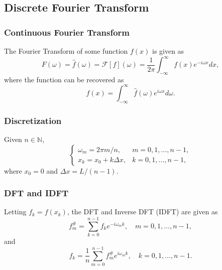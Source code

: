 \documentclass{beamer}
\begin{document}
\subsection{Discrete Fourier Transform}
\begin{frame}
	\frametitle{Continuous Fourier Transform}
	The Fourier Transform of some function $f(x)$ is given as
	\begin{equation*}
		F(\omega) = \hat{f}(\omega) = \mathcal{F}\left[f\right](\omega) = \frac{1}{2\pi}\int_{-\infty}^{\infty}{f(x)e^{-i\omega x}dx},
	\end{equation*}
	where the function can be recovered as
	\begin{equation*}
		f(x) = \int_{-\infty}^{\infty}{\hat{f}(\omega)e^{i\omega x}d\omega}.
	\end{equation*}
\end{frame}
\begin{frame}
	\frametitle{Discretization}
	Given $n \in \mathbb{N}$,
	\begin{equation*}
		\begin{cases}
			\omega_m = 2\pi m/n, & m = 0,1,\dots,n-1, \\
			x_k = x_0 + k\Delta x, & k = 0,1,\dots,n-1,
		\end{cases}
	\end{equation*}
	where $x_0 = 0$ and $\Delta x = L/(n-1)$.
\end{frame}
\begin{frame}
	\frametitle{DFT and IDFT}
	Letting $f_k = f(x_k)$, the DFT and Inverse DFT (IDFT) are given as
	\begin{equation*}
		f_{m}^{\#} = \sum_{k=0}^{n-1}{f_ke^{-i\omega_mk}}, \quad m = 0,1,\dots,n-1,
	\end{equation*}
	and
	\begin{equation*}
		f_{k} = \frac{1}{n}\sum_{m=0}^{n-1}{f_{m}^{\#}e^{i\omega_mk}}, \quad k = 0,1,\dots,n-1.
	\end{equation*}
\end{frame}
\end{document}
